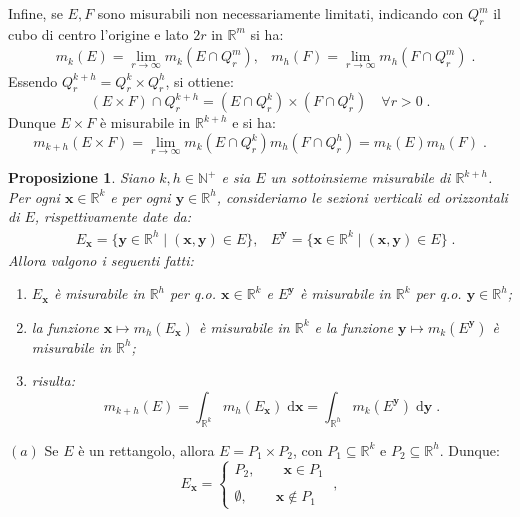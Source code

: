 \documentclass[a4paper,12pt]{report}
\theoremstyle{plain}
\newtheorem{prop}{Proposizione}[section]
\theoremstyle{definition}
\theoremstyle{remark}
\newcommand{\diff}[1]{\mathrm{d}#1}
\numberwithin{equation}{section}
\begin{document}
Infine, se $E,F$ sono misurabili non necessariamente limitati, indicando con $Q_r^m$ il cubo di centro l'origine e lato $2r$ in $\mathbb{
R}^m$ si ha:
\begin{align}
&m_k(E)=\lim_{r\to\infty}m_k(E\cap Q_r^m), &m_h(F)=\lim_{r\to\infty}m_h(F\cap Q_r^m)\;.
\end{align}
Essendo $Q_r^{k+h}=Q_r^k\times Q_r^h$, si ottiene:
\begin{equation}
(E\times F)\cap Q_r^{k+h}=(E\cap Q_r^k)\times(F\cap Q_r^h) \quad \forall r>0\;.
\end{equation}
Dunque $E\times F$ è misurabile in $\mathbb{R}^{k+h}$ e si ha:
\begin{equation}
m_{k+h}(E\times F)=\lim_{r\to\infty}m_k(E\cap Q_r^k)m_h(F\cap Q_r^h)=m_k(E)m_h(F)\;.
\end{equation}
\endproof
\begin{prop} Siano $k,h\in \mathbb{N}^+$ e sia $E$ un sottoinsieme misurabile di $\mathbb{R}^{k+h}$. Per ogni $\mathbf{x}\in\mathbb{R}^k$ e per ogni $\mathbf{y}\in\mathbb{R}^h$, consideriamo le sezioni verticali ed orizzontali di $E$, rispettivamente date da:
\begin{align}
&E_{\mathbf{x}}=\{\mathbf{y}\in\mathbb{R}^h\;|\;(\mathbf{x},\mathbf{y})\in E\},  &E^{\mathbf{y}}=\{\mathbf{x}\in\mathbb{R}^k\;|\;(
\mathbf{x},\mathbf{y})\in E\}\;.
\end{align}
Allora valgono i seguenti fatti:
\begin{enumerate}
 \item $E_{\mathbf{x}}$ è misurabile in $\mathbb{R}^h$ per q.o. $\mathbf{x}\in\mathbb{R}^k$ e $E^{\mathbf{y}}$ è misurabile in $\mathbb{R}^k$ per q.o. $\mathbf{y}\in\mathbb{R}^h$;
 \item la funzione $\mathbf{x}\longmapsto m_h(E_{\mathbf{x}})$ è misurabile in $\mathbb{R}^k$ e la funzione $\mathbf{y}\longmapsto m_k(E^{\mathbf{y}})$ è misurabile in $\mathbb{R}^h$;
 \item risulta:
\begin{equation}
m_{k+h}(E)=\int_{\mathbb{R}^k} m_h(E_{\mathbf{x}})\;\diff{\mathbf{x}}=\int_{\mathbb{R}^h} m_k(E^{\mathbf{y}})\;\diff{\mathbf{y}}\;.
\end{equation}
\end{enumerate}
\end{prop}
\proof 
$(a)$ Se $E$ è un rettangolo, allora $E=P_1\times P_2$, con $P_1\subseteq \mathbb{R}^k$ e $P_2\subseteq \mathbb{R}^h$. Dunque:
\begin{equation}
E_{\mathbf{x}}=\begin{cases}
                P_2,\qquad \mathbf{x}\in P_1 \\
\\
\emptyset, \qquad \mathbf{x}\not\in P_1
               \end{cases}\;,
\end{equation}
\end{document}
